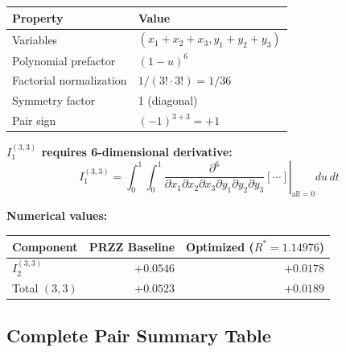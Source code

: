 \documentclass[11pt]{article}
\begin{document}
\begin{center}
\begin{tabular}{ll}
\toprule
Property & Value \\
\midrule
Variables & $(x_1+x_2+x_3, y_1+y_2+y_3)$ \\
Polynomial prefactor & $(1-u)^6$ \\
Factorial normalization & $1/(3! \cdot 3!) = 1/36$ \\
Symmetry factor & 1 (diagonal) \\
Pair sign & $(-1)^{3+3} = +1$ \\
\bottomrule
\end{tabular}
\end{center}

\textbf{$I_1^{(3,3)}$ requires 6-dimensional derivative:}
\begin{equation}
I_1^{(3,3)} = \int_0^1 \int_0^1 \left.\frac{\partial^6}{\partial x_1 \partial x_2 \partial x_3 \partial y_1 \partial y_2 \partial y_3}\left[\cdots\right]\right|_{\text{all}=0} du\, dt
\end{equation}

\textbf{Numerical values:}

\begin{center}
\begin{tabular}{lrr}
\toprule
Component & PRZZ Baseline & Optimized ($R^*=1.14976$) \\
\midrule
$I_2^{(3,3)}$ & $+0.0546$ & $+0.0178$ \\
Total $(3,3)$ & $+0.0523$ & $+0.0189$ \\
\bottomrule
\end{tabular}
\end{center}

\subsection{Complete Pair Summary Table}
\end{document}
